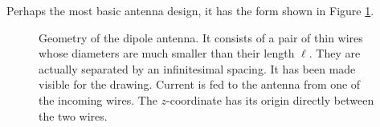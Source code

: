 	\begin{exmp}
		Perhaps the most basic antenna design, it has the form shown in 
		Figure \ref{fig:active.antennae.dipoleAntenna}. 
		
				\begin{figure}
					\begin{center}
					
					\vspace{0.1cm}
					\end{center}
					\caption[Geometry of the dipole antenna]
							{Geometry of the dipole antenna. It consists of a pair of thin
							wires whose diameters are much smaller than their length $\ell$.
							They are actually separated by an infinitesimal spacing. It has
							been made visible for the drawing. Current is fed to the antenna
							from one of the incoming wires. The $z$-coordinate has its origin
							directly between the two wires.}
					\label{fig:active.antennae.dipoleAntenna}
				\end{figure}
		

\end{exmp}
